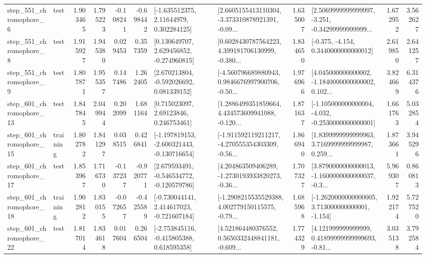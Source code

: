 \begin{tabular}{llrrrrllrlrr}
   step\_551\_chromophore\_6 &      test &      1.903465 &    1.795223 &     -0.108241 & -0.698442 &     [-1.635512375, 2.11644979, 0.302284125] &  [2.6605155413110304, -3.373310878921391, -0.09... &       1.635007 &  [2.5069999999999997, -3.251, -0.34299999999999... &            1.672952 &          3.562627 \\
   step\_551\_chromophore\_8 &      test &      1.915927 &    1.945380 &      0.029453 &  0.357359 &    [0.130649707, 2.629456852, -0.274960815] &  [0.6028430787564223, 4.399181706130999, -0.380... &       1.834650 &               [-0.375, -4.154, 0.3440000000000012] &            2.619850 &          2.641257 \\
   step\_551\_chromophore\_9 &      test &      1.807871 &    1.955357 &      0.147486 &  1.262405 &    [2.670213804, -0.592026692, 0.081339152] &  [-4.560796689880943, 0.9846676997900706, -0.50... &       1.976966 &  [4.045000000000002, -1.1840000000000002, 0.102... &            3.824669 &          6.314376 \\
  step\_601\_chromophore\_13 &      test &      1.847845 &    2.049944 &      0.202099 &  1.681164 &      [0.715023097, 2.69123846, 0.246753461] &  [1.2886499351859664, 4.434573609941088, -0.120... &       1.871637 &  [-1.105000000000004, -4.032, -0.2530000000000001] &            1.661763 &          5.032854 \\
  step\_601\_chromophore\_15 &  training &      1.802782 &    1.841297 &      0.038515 &  0.426841 &  [-1.197819153, -2.600321443, -0.130716654] &  [-1.911592119211217, -4.270555354303309, -0.56... &       1.866940 &  [1.8399999999999963, 3.7169999999999987, 0.259... &            1.873661 &          3.945296 \\
  step\_601\_chromophore\_17 &      test &      1.853967 &    1.716730 &     -0.137237 & -0.920771 &   [2.679593491, -0.546534772, -0.120579786] &  [4.204863509406289, -1.2730193933820273, -0.36... &       1.707327 &  [3.8790000000000013, -1.1600000000000037, -0.3... &            5.969307 &          0.860813 \\
  step\_601\_chromophore\_18 &  training &      1.902812 &    1.830155 &     -0.072657 & -0.425589 &   [-0.730044141, 2.414617023, -0.721607184] &  [-1.2908215535529388, 4.002779150115575, -0.79... &       1.685968 &   [-1.2620000000000005, 3.713000000000001, -1.154] &            1.922174 &          5.727520 \\
  step\_601\_chromophore\_22 &      test &      1.817014 &    1.834618 &      0.017604 &  0.266504 &   [-2.753845116, -0.415805388, 0.618595358] &  [4.521864480376552, 0.5650332448841181, -0.609... &       1.774329 &  [4.121999999999999, 0.41899999999999693, -0.81... &            3.035138 &          3.792584 \\

\end{tabular}
